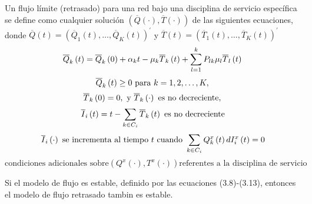 \begin{Def}
Un flujo l\'imite (retrasado) para una red bajo una disciplina de
servicio espec\'ifica se define como cualquier soluci\'on
 $\left(\overline{Q}\left(\cdot\right),\overline{T}\left(\cdot\right)\right)$ de las siguientes ecuaciones, donde
$\overline{Q}\left(t\right)=\left(\overline{Q}_{1}\left(t\right),\ldots,\overline{Q}_{K}\left(t\right)\right)^{'}$
y
$\overline{T}\left(t\right)=\left(\overline{T}_{1}\left(t\right),\ldots,\overline{T}_{K}\left(t\right)\right)^{'}$
\begin{equation}\label{Eq.3.8}
\overline{Q}_{k}\left(t\right)=\overline{Q}_{k}\left(0\right)+\alpha_{k}t-\mu_{k}\overline{T}_{k}\left(t\right)+\sum_{l=1}^{k}P_{lk}\mu_{l}\overline{T}_{l}\left(t\right)\\
\end{equation}
\begin{equation}\label{Eq.3.9}
\overline{Q}_{k}\left(t\right)\geq0\textrm{ para }k=1,2,\ldots,K,\\
\end{equation}
\begin{equation}\label{Eq.3.10}
\overline{T}_{k}\left(0\right)=0,\textrm{ y }\overline{T}_{k}\left(\cdot\right)\textrm{ es no decreciente},\\
\end{equation}
\begin{equation}\label{Eq.3.11}
\overline{I}_{i}\left(t\right)=t-\sum_{k\in C_{i}}\overline{T}_{k}\left(t\right)\textrm{ es no decreciente}\\
\end{equation}
\begin{equation}\label{Eq.3.12}
\overline{I}_{i}\left(\cdot\right)\textrm{ se incrementa al tiempo }t\textrm{ cuando }\sum_{k\in C_{i}}Q_{k}^{x}\left(t\right)dI_{i}^{x}\left(t\right)=0\\
\end{equation}
\begin{equation}\label{Eq.3.13}
\textrm{condiciones adicionales sobre
}\left(Q^{x}\left(\cdot\right),T^{x}\left(\cdot\right)\right)\textrm{
referentes a la disciplina de servicio}
\end{equation}
\end{Def}

\begin{Lema}\label{Lema3.1}
Si el modelo de flujo es estable, definido por las ecuaciones
(3.8)-(3.13), entonces el modelo de flujo retrasado tambin es
estable.
\end{Lema}

